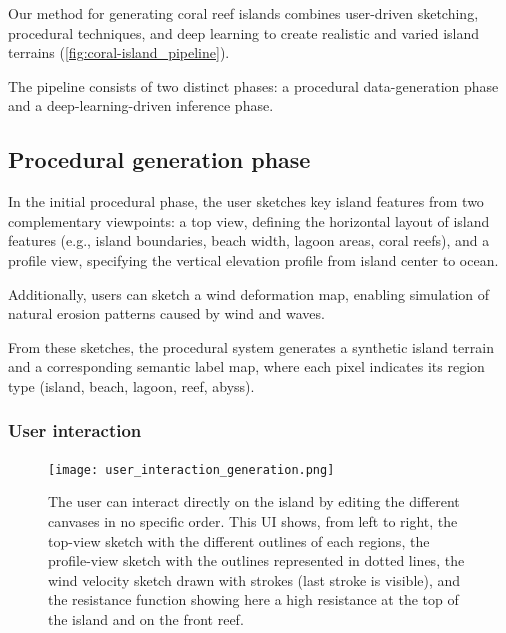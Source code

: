 Our method for generating coral reef islands combines user-driven sketching, procedural techniques, and deep learning to create realistic and varied island terrains (\cref{fig:coral-island_pipeline}). 

The pipeline consists of two distinct phases: a procedural data-generation phase and a deep-learning-driven inference phase. 

\subsection{Procedural generation phase}
\label{sec:coral-island_proc-phase}

In the initial procedural phase, the user sketches key island features from two complementary viewpoints: a top view, defining the horizontal layout of island features (e.g., island boundaries, beach width, lagoon areas, coral reefs), and a profile view, specifying the vertical elevation profile from island center to ocean.


Additionally, users can sketch a wind deformation map, enabling simulation of natural erosion patterns caused by wind and waves.

From these sketches, the procedural system generates a synthetic island terrain and a corresponding semantic label map, where each pixel indicates its region type (island, beach, lagoon, reef, abyss).




\subsubsection*{User interaction}
\label{sec:coral-island_description-UI}

\begin{figure}[H]
    \centering
    \texttt{[image: user\_interaction\_generation.png]}
    \caption{The user can interact directly on the island by editing the different canvases in no specific order. This UI shows, from left to right, the top-view sketch with the different outlines of each regions, the profile-view sketch with the outlines represented in dotted lines, the wind velocity sketch drawn with strokes (last stroke is visible), and the resistance function showing here a high resistance at the top of the island and on the front reef.}
    \label{fig:coral-island_wind-from-strokes-interaction}
\end{figure}

